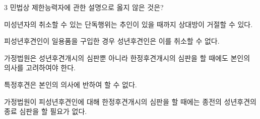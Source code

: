 \begin{question}{3}
민법상 제한능력자에 관한 설명으로 옳지 않은 것은?
\begin{choices}
  \item 미성년자의 취소할 수 있는 단독행위는 추인이 있을 때까지 상대방이 거절할 수 있다.
  \item 피성년후견인이 일용품을 구입한 경우 성년후견인은 이를 취소할 수 없다.
  \item 가정법원은 성년후견개시의 심판뿐 아니라 한정후견개시의 심판을 할 때에도 본인의 의사를 고려하여야 한다.
  \item 특정후견은 본인의 의사에 반하여 할 수 없다.
  \item 가정법원이 피성년후견인에 대해 한정후견개시의 심판을 할 때에는 종전의 성년후견의 종료 심판을 할 필요가 없다.
\end{choices}
\end{question}
